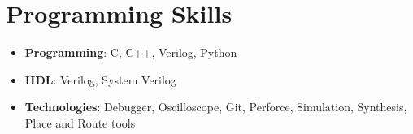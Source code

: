 \documentclass[letterpaper,11pt]{article}
\newcommand{\resumeItem}[2]{
  \item\small{
    \textbf{#1}{: #2 \vspace{-2pt}}
  }
}
\newcommand{\resumeSubItem}[2]{\resumeItem{#1}{#2}\vspace{-4pt}}
\newcommand{\resumeSubHeadingListStart}{\begin{itemize}[leftmargin=*]}
\newcommand{\resumeSubHeadingListEnd}{\end{itemize}}
\begin{document}
%
\section{Programming Skills}
  \resumeSubHeadingListStart
    \resumeSubItem{Programming}
    {C, C++, Verilog, Python}
    \resumeSubItem{HDL}
    {Verilog, System Verilog}
    \resumeSubItem{Technologies}
    {Debugger, Oscilloscope, Git, Perforce, Simulation, Synthesis, Place and Route tools}
  \resumeSubHeadingListEnd


\end{document}
